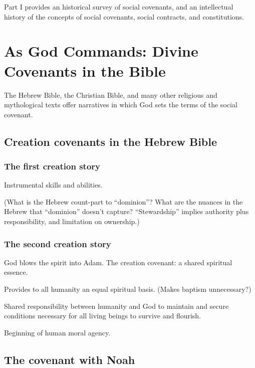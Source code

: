 \documentclass[
]{book}
\begin{document}
Part I provides an historical survey of social covenants, and an intellectual history of the concepts of social covenants, social contracts, and constitutions.

\hypertarget{as-god-commands-divine-covenants-in-the-bible}{%
\chapter{As God Commands: Divine Covenants in the Bible}\label{as-god-commands-divine-covenants-in-the-bible}}

The Hebrew Bible, the Christian Bible, and many other religious and mythological texts offer narratives in which God sets the terms of the social covenant.

\hypertarget{creation-covenants-in-the-hebrew-bible}{%
\section{Creation covenants in the Hebrew Bible}\label{creation-covenants-in-the-hebrew-bible}}

\hypertarget{the-first-creation-story}{%
\subsection{The first creation story}\label{the-first-creation-story}}

Instrumental skills and abilities.

(What is the Hebrew count-part to ``dominion''? What are the nuances in
the Hebrew that ``dominion'' doesn't capture? ``Stewardship'' implies
authority plus responsibility, and limitation on ownership.)

\hypertarget{the-second-creation-story}{%
\subsection{The second creation story}\label{the-second-creation-story}}

God blows the spirit into Adam.
The creation covenant: a shared spiritual essence.

Provides to all humanity an equal spiritual basis. (Makes baptism
unnecessary?)

Shared responsibility between humanity and God to maintain and secure
conditions necessary for all living beings to survive and flourish.

Beginning of human moral agency.

\hypertarget{the-covenant-with-noah}{%
\section{The covenant with Noah}\label{the-covenant-with-noah}}
\end{document}
